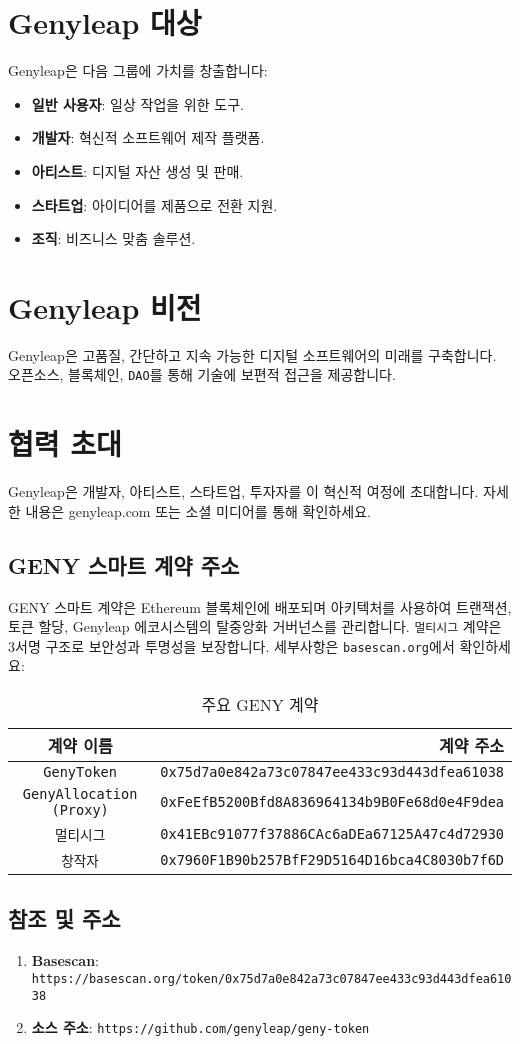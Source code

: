 \documentclass[a4paper,12pt,openany]{book}
\begin{document}
\chapter{Genyleap 대상}
Genyleap은 다음 그룹에 가치를 창출합니다:
\begin{itemize}
    \item \textbf{일반 사용자}: 일상 작업을 위한 도구.
    \item \textbf{개발자}: 혁신적 소프트웨어 제작 플랫폼.
    \item \textbf{아티스트}: 디지털 자산 생성 및 판매.
    \item \textbf{스타트업}: 아이디어를 제품으로 전환 지원.
    \item \textbf{조직}: 비즈니스 맞춤 솔루션.
\end{itemize}

\chapter{Genyleap 비전}
Genyleap은 고품질, 간단하고 지속 가능한 디지털 소프트웨어의 미래를 구축합니다. 오픈소스, 블록체인, \texttt{DAO}를 통해 기술에 보편적 접근을 제공합니다.

\chapter{협력 초대}
Genyleap은 개발자, 아티스트, 스타트업, 투자자를 이 혁신적 여정에 초대합니다. 자세한 내용은 genyleap.com 또는 소셜 미디어를 통해 확인하세요.

\section*{GENY 스마트 계약 주소}
GENY 스마트 계약은 Ethereum 블록체인에 배포되며  아키텍처를 사용하여 트랜잭션, 토큰 할당, Genyleap 에코시스템의 탈중앙화 거버넌스를 관리합니다. \texttt{멀티시그} 계약은 3서명 구조로 보안성과 투명성을 보장합니다. 세부사항은 \texttt{basescan.org}에서 확인하세요:

\begin{table}[h]
\centering
\caption*{주요 GENY 계약}
\small
\begin{tabular}{c r}
\hline
\textbf{계약 이름} & \textbf{계약 주소} \\
\hline
\texttt{GenyToken} & {\texttt{0x75d7a0e842a73c07847ee433c93d443dfea61038}} \\
\texttt{GenyAllocation (Proxy)} & {\texttt{0xFeEfB5200Bfd8A836964134b9B0Fe68d0e4F9dea}} \\
\texttt{멀티시그} & {\texttt{0x41EBc91077f37886CAc6aDEa67125A47c4d72930}} \\
\texttt{창작자} & {\texttt{0x7960F1B90b257BfF29D5164D16bca4C8030b7f6D}} \\
\hline
\end{tabular}
\end{table}

\section*{참조 및 주소}

\begin{enumerate}
    \item \textbf{Basescan}: \texttt{https://basescan.org/token/0x75d7a0e842a73c07847ee433c93d443dfea61038}
    \item \textbf{소스 주소}: \texttt{https://github.com/genyleap/geny-token}
\end{enumerate}
\end{document}
